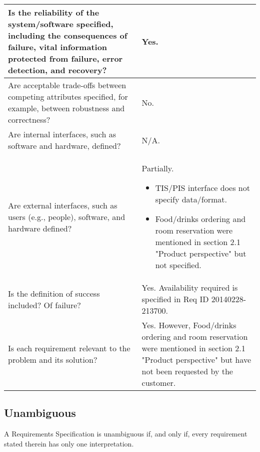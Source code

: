 \documentclass[Main]{subfiles}
\begin{document}
\begin{longtable}{p{8cm} | p{7.3cm}}
Is the reliability of the system/software specified, including the consequences of failure, vital information protected from failure, error detection, and recovery? & Yes. \\ \hline

Are acceptable trade-offs between competing attributes specified, for example, between robustness and correctness? & No. \\ \hline

Are internal interfaces, such as software and hardware, defined? & N/A. \\ \hline

Are external interfaces, such as users (e.g., people), software, and hardware defined? & Partially. \begin{itemize}
\item TIS/PIS interface does not specify data/format.
\item Food/drinks ordering and room reservation were mentioned in section 2.1 "Product perspective" but not specified.
\end{itemize} \\ \hline

Is the definition of success included? Of failure? & Yes. Availability required is specified in Req ID 20140228-213700. \\ \hline

Is each requirement relevant to the problem and its solution? & Yes. However, Food/drinks ordering and room reservation were mentioned in section 2.1 "Product perspective" but have not been requested by the customer. \\ \hline

\end{longtable}

\subsection{Unambiguous}
A Requirements Specification is unambiguous if, and only if, every requirement stated therein has only one interpretation.
\end{document}
